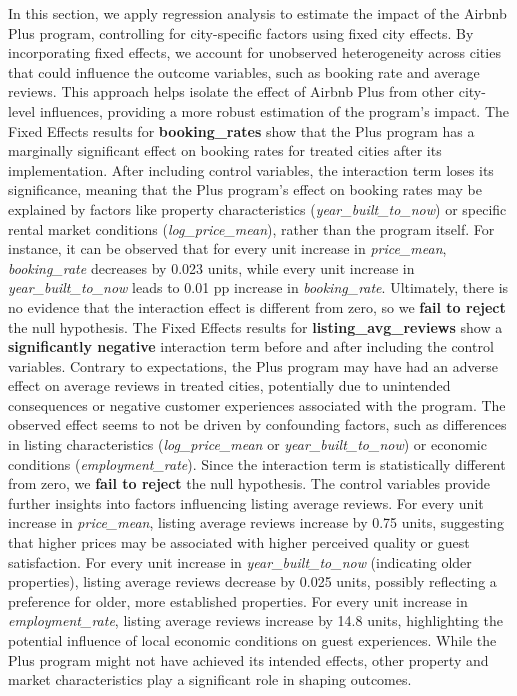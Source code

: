 \documentclass[
  12pt,
]{article}
\begin{document}
In this section, we apply regression analysis to estimate the impact of
the Airbnb Plus program, controlling for city-specific factors using
fixed city effects. By incorporating fixed effects, we account for
unobserved heterogeneity across cities that could influence the outcome
variables, such as booking rate and average reviews. This approach helps
isolate the effect of Airbnb Plus from other city-level influences,
providing a more robust estimation of the program's impact. The Fixed
Effects results for \textbf{booking\_rates} show that the Plus program
has a marginally significant effect on booking rates for treated cities
after its implementation. After including control variables, the
interaction term loses its significance, meaning that the Plus program's
effect on booking rates may be explained by factors like property
characteristics (\emph{year\_built\_to\_now}) or specific rental market
conditions (\emph{log\_price\_mean}), rather than the program itself.
For instance, it can be observed that for every unit increase in
\emph{price\_mean}, \emph{booking\_rate} decreases by 0.023 units, while
every unit increase in \emph{year\_built\_to\_now} leads to 0.01 pp
increase in \emph{booking\_rate}. Ultimately, there is no evidence that
the interaction effect is different from zero, so we \textbf{fail to
reject} the null hypothesis. The Fixed Effects results for
\textbf{listing\_avg\_reviews} show a \textbf{significantly negative}
interaction term before and after including the control variables.
Contrary to expectations, the Plus program may have had an adverse
effect on average reviews in treated cities, potentially due to
unintended consequences or negative customer experiences associated with
the program. The observed effect seems to not be driven by confounding
factors, such as differences in listing characteristics
(\emph{log\_price\_mean} or \emph{year\_built\_to\_now}) or economic
conditions (\emph{employment\_rate}). Since the interaction term is
statistically different from zero, we \textbf{fail to reject} the null
hypothesis. The control variables provide further insights into factors
influencing listing average reviews. For every unit increase in
\emph{price\_mean}, listing average reviews increase by 0.75 units,
suggesting that higher prices may be associated with higher perceived
quality or guest satisfaction. For every unit increase in
\emph{year\_built\_to\_now} (indicating older properties), listing
average reviews decrease by 0.025 units, possibly reflecting a
preference for older, more established properties. For every unit
increase in \emph{employment\_rate}, listing average reviews increase by
14.8 units, highlighting the potential influence of local economic
conditions on guest experiences. While the Plus program might not have
achieved its intended effects, other property and market characteristics
play a significant role in shaping outcomes.
\end{document}

